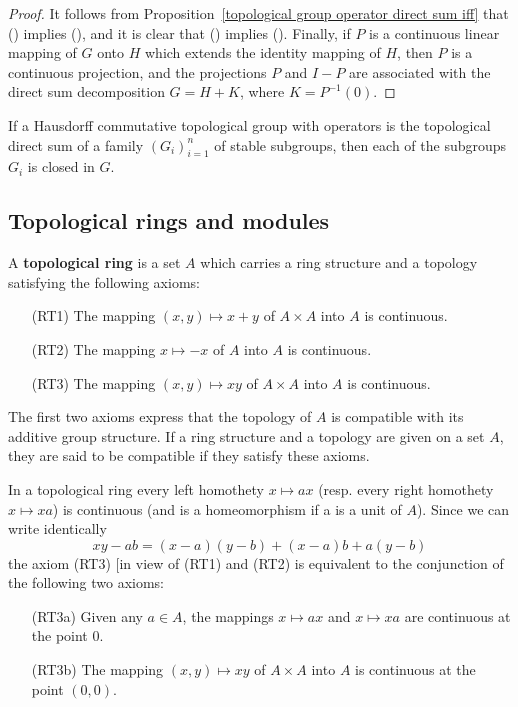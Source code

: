 \begin{proof}
It follows from Proposition~\ref{topological group operator direct sum iff} that () implies (), and it is clear that () implies (). Finally, if $P$ is a continuous linear mapping of $G$ onto $H$ which extends the identity mapping of $H$, then $P$ is a continuous projection, and the projections $P$ and $I-P$ are associated with the direct sum decomposition $G=H+K$, where $K=P^{-1}(0)$.
\end{proof}
\begin{corollary}
If a Hausdorff commutative topological group with operators is the topological direct sum of a family $(G_i)_{i=1}^{n}$ of stable subgroups, then each of the subgroups $G_i$ is closed in $G$.
\end{corollary}
\subsection{Topological rings and modules}
\begin{definition}
A \textbf{topological ring} is a set $A$ which carries a ring structure and a topology satisfying the following axioms:
\begin{enumerate}[leftmargin=40pt]
\item[(RT1)] The mapping $(x,y)\mapsto x+y$ of $A\times A$ into $A$ is continuous.
\item[(RT2)] The mapping $x\mapsto-x$ of $A$ into $A$ is continuous.
\item[(RT3)] The mapping $(x,y)\mapsto xy$ of $A\times A$ into $A$ is continuous.
\end{enumerate}
\end{definition}
The first two axioms express that the topology of $A$ is compatible with its additive group structure. If a ring structure and a topology are given on a set $A$, they are said to be compatible if they satisfy these axioms.\par
In a topological ring every left homothety $x\mapsto ax$ (resp. every right homothety $x\mapsto xa$) is continuous (and is a homeomorphism if a is a unit of $A$). Since we can write identically
\[xy-ab=(x-a)(y-b)+(x-a)b+a(y-b)\]
the axiom (RT3) [in view of (RT1) and (RT2) is equivalent to the conjunction of the following two axioms:
\begin{enumerate}[leftmargin=45pt]
\item[(RT3a)] Given any $a\in A$, the mappings $x\mapsto ax$ and $x\mapsto xa$ are continuous at the point $0$.
\item[(RT3b)] The mapping $(x,y)\mapsto xy$ of $A\times A$ into $A$ is continuous at the point $(0,0)$.
\end{enumerate}
